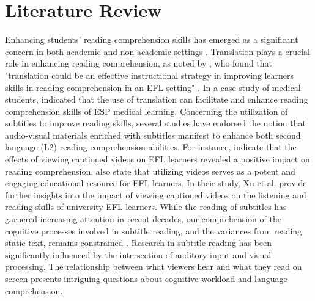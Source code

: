 \section{Literature Review}\label{sec-literaturereview}

Enhancing students' reading comprehension skills has emerged as a
significant concern in both academic and non-academic settings \cite{kim2023}. Translation plays a crucial role in enhancing reading
comprehension, as noted by \textcite{alaboud2022}, who found that "translation
could be an effective instructional strategy in improving
learners\textquotesingle{} skills in reading comprehension in an EFL
setting" \textcite[p. 424]{alaboud2022}. In a case study of medical students,
\textcite{rushwan2017} indicated that the use of translation can facilitate and
enhance reading comprehension skills of ESP medical learning. Concerning
the utilization of subtitles to improve reading skills, several studies
\cite{omar2023,qazi2023} have endorsed the notion that
audio-visual materials enriched with subtitles manifest to enhance both
second language (L2) reading comprehension abilities. For instance,
\textcite{haider2022} indicate that the effects of viewing
captioned videos on EFL learners revealed a positive impact on reading
comprehension. \textcite{xu2022} also state that utilizing videos serves
as a potent and engaging educational resource for EFL learners. In their
study, Xu et al. provide further insights into the impact of viewing
captioned videos on the listening and reading skills of university EFL
learners. While the reading of subtitles has garnered increasing
attention in recent decades, our comprehension of the cognitive
processes involved in subtitle reading, and the variances from reading
static text, remains constrained \cite{baranowska2020}. Research in
subtitle reading has been significantly influenced by the intersection
of auditory input and visual processing. The relationship between what
viewers hear and what they read on screen presents intriguing questions
about cognitive workload and language comprehension.

